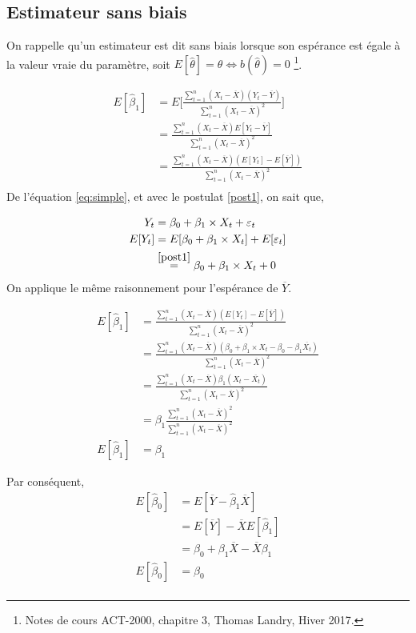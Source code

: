 \documentclass[11pt,french]{report}
\begin{document}
\subsection{Estimateur sans biais}
On rappelle qu'un estimateur est dit sans biais lorsque son espérance est égale à la valeur vraie du paramètre, soit $E[\hat{\theta}] = \theta \Leftrightarrow b(\hat{\theta}) = 0$ \footnote{Notes de cours ACT-2000, chapitre 3, Thomas Landry, Hiver 2017.}.

\begin{align*}
E[\hat{\beta}_1] &= E \Bigg[ \frac{\sum_{t=1}^n(X_t- \overline{X})(Y_t - \overline{Y})}{\sum_{t=1}^n(X_t - \overline{X})^2} \Bigg] \\
&= \frac{\sum_{t=1}^n(X_t- \overline{X})E[Y_t - \overline{Y}]}{\sum_{t=1}^n(X_t - \overline{X})^2} \\
&= \frac{\sum_{t=1}^n(X_t- \overline{X})(E[Y_t] - E[\overline{Y}])}{\sum_{t=1}^n(X_t - \overline{X})^2} \\
\end{align*}
De l'équation \ref{eq:simple}, et avec le postulat \ref{post1}, on sait que,

\begin{align*}
Y_t &= \beta_0 + \beta_1\times X_t + \varepsilon_t \\
E[Y_t] &= E[\beta_0 + \beta_1\times X_t] + E[\varepsilon_t] \\
&\overset{\ref{post1}}{=} \beta_0 + \beta_1\times X_t + 0 \\
\end{align*}
On applique le même raisonnement pour l'espérance de $\overline{Y}$. 

\begin{align*}
E[\hat{\beta}_1] &= \frac{\sum_{t=1}^n(X_t- \overline{X})(E[Y_t] - E[\overline{Y}])}{\sum_{t=1}^n(X_t - \overline{X})^2} \\
&= \frac{\sum_{t=1}^n(X_t- \overline{X})(\beta_0 + \beta_1\times X_t - \beta_0 - \beta_1\overline{X_t})}{\sum_{t=1}^n(X_t - \overline{X})^2} \\
&= \frac{\sum_{t=1}^n(X_t- \overline{X})\beta_1 (X_t - \overline{X_t})}{\sum_{t=1}^n(X_t - \overline{X})^2} \\
&= \beta_1 \frac{\sum_{t=1}^n(X_t- \overline{X})^2}{\sum_{t=1}^n(X_t - \overline{X})^2} \\
E[\hat{\beta}_1] &= \beta_1
\end{align*}
\bigskip

Par conséquent,
\begin{align*}
E[\hat{\beta}_0] &= E[\overline{Y} - \hat{\beta}_1 \overline{X}] \\
&= E[\overline{Y}] - \overline{X} E[\hat{\beta}_1]  \\
&= \beta_0 + \beta_1\overline{X} - \overline{X}\beta_1 \\
E[\hat{\beta}_0]  &= \beta_0 \\
\end{align*}
\end{document}
